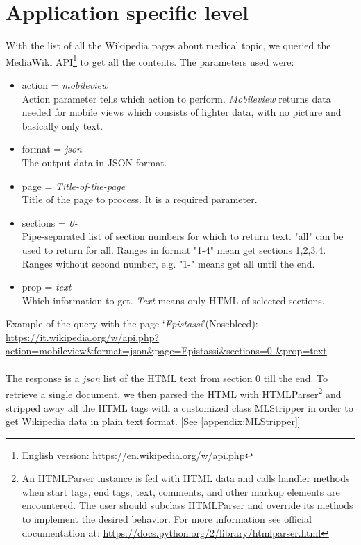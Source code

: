 \section{Application specific level}
With the list of all the Wikipedia pages about medical topic, we queried the MediaWiki API\footnote{English version: \url{https://en.wikipedia.org/w/api.php}} to get all the contents. 
The parameters used were:
\begin{itemize}
	\item action = \textit{mobileview} \\
	Action parameter tells which action to perform. \textit{Mobileview} returns data needed for mobile views which consists of lighter data, with no picture and basically only text.
	\item format = \textit{json} \\
	The output data in JSON format.
	\item page = \textit{Title-of-the-page} \\
	Title of the page to process. It is a required parameter.
	\item sections = \textit{0-} \\
	Pipe-separated list of section numbers for which to return text. "all" can be used to return for all. Ranges in format "1-4" mean get sections 1,2,3,4. Ranges without second number, e.g. "1-" means get all until the end.
	\item prop = \textit{text} \\
	Which information to get. \textit{Text} means only HTML of selected sections.
\end{itemize}
Example of the query with the page \enquote*{\textit{Epistassi}}(Nosebleed):\\
\url{https://it.wikipedia.org/w/api.php?action=mobileview\&format=json\&page=Epistassi\&sections=0-\&prop=text}
\\\\
The response is a \textit{json} list of the HTML text from section 0 till the end. To retrieve a single document, we then parsed the HTML with HTMLParser\footnote{An HTMLParser instance is fed with HTML data and calls handler methods when start tags, end tags, text, comments, and other markup elements are encountered. The user should subclass HTMLParser and override its methods to implement the desired behavior. For more information see official documentation at: \url{https://docs.python.org/2/library/htmlparser.html}} and stripped away all the HTML tags with a customized class MLStripper in order to get Wikipedia data in plain text format. [See \ref{appendix:MLStripper}]


